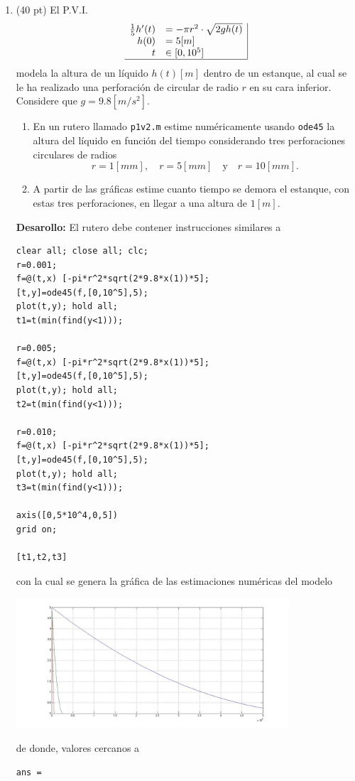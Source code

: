 \documentclass[11pt]{article}
\begin{document}
\begin{enumerate}
\item (40 pt) El P.V.I.
$$
\begin{array}{rl|}
\frac{1}{5}h'(t)	&= -\pi r^2\cdot \sqrt{2 g h(t)}\\
h(0)	&= 5[m] \\ 
t	&\in[0,10^5] \\\hline
\end{array}
$$
modela la altura de un l\'iquido $h(t)[m]$ dentro de un estanque, al cual se le ha realizado una perforaci\'on de circular de radio $r$ en su cara inferior. Considere que $g=9.8[m/s^2]$.

\begin{enumerate}
	\item En un rutero llamado \texttt{p1v2.m} estime num\'ericamente usando \texttt{ode45} la altura del l\'iquido en funci\'on del tiempo considerando tres perforaciones circulares de radios
$$
r=1[mm],\quad  r=5[mm]\quad \text{y}\quad r=10[mm].
$$
	\item A partir de las gr\'aficas estime cuanto tiempo se demora el estanque, con estas tres perforaciones, en llegar a una altura de $1[m]$. 
    
\end{enumerate}
	
\textbf{Desarollo:} 
El rutero debe contener instrucciones similares a
\begin{lstlisting}
clear all; close all; clc;
r=0.001;
f=@(t,x) [-pi*r^2*sqrt(2*9.8*x(1))*5];
[t,y]=ode45(f,[0,10^5],5);
plot(t,y); hold all;
t1=t(min(find(y<1)));

r=0.005;
f=@(t,x) [-pi*r^2*sqrt(2*9.8*x(1))*5];
[t,y]=ode45(f,[0,10^5],5);
plot(t,y); hold all;
t2=t(min(find(y<1)));

r=0.010;
f=@(t,x) [-pi*r^2*sqrt(2*9.8*x(1))*5];
[t,y]=ode45(f,[0,10^5],5);
plot(t,y); hold all;
t3=t(min(find(y<1)));

axis([0,5*10^4,0,5])
grid on;

[t1,t2,t3]
\end{lstlisting}\fbox{20pt}
con la cual se genera la gráfica de las estimaciones num\'ericas del modelo
\begin{center}
\includegraphics[width=0.8\textwidth]{./p1v2.jpg}
\fbox{10pt}
\end{center}
de donde, valores cercanos a 
\begin{lstlisting}
ans =


\end{lstlisting}
\end{enumerate}
\end{document}
